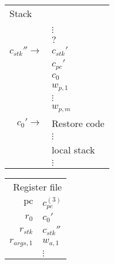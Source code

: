\documentclass[a4paper]{article}
\newcommand{\var}[1]{\mathit{#1}}
\newcommand{\pc}{\mathit{pc}}
\newcommand{\pcreg}{\mathrm{pc}}
\begin{document}
              \begin{figure}
                \label{fig:stack-after-restrict-and-zero}
                \centering
                \begin{tabular}[!h]{r | >{\raggedright\arraybackslash}p{3cm} |}
                  \multicolumn{2}{l}{Stack} \\
                  \cline{2-2}
               & \\
               & $\vdots$\\
                  \cline{2-2}
               & $?$\\
                  \cline{2-2}
                  $c_{\var{stk}}'' \rightarrow$  & $c_{\var{stk}}'$ \\
                  \cline{2-2}
               & $c_\pc'$ \\
                  \cline{2-2}
               & $c_0$ \\
                  \cline{2-2}
               & $w_{p,1}$ \\
                  \cline{2-2}
               & $\vdots$ \\
                  \cline{2-2}
               & $w_{p,m}$ \\
                  \cline{2-2}
                  $c_0' \rightarrow$   & Restore code \\
               & $\vdots$\\
                  \cline{2-2}
               & local stack\\
               & $\vdots$\\
                  \cline{2-2}
                \end{tabular}
                \hspace{1cm}
                \begin{tabular}{r | >{\centering\arraybackslash}p{0.75cm} |}
                  \multicolumn{2}{r}{Register file} \\
                  \cline{2-2}
                  $\pcreg$ & $c_{\pc}^{(3)}$\\
                  \cline{2-2}
                  $r_0$  & $c_0'$ \\
                  \cline{2-2}
                  $r_{\var{stk}}$  & $c_{\var{stk}}''$ \\
                  \cline{2-2}
                  $r_{\var{args},1}$ & $w_{a,1}$ \\
                  \cline{2-2}
                           & $\vdots$ \\
                  \cline{2-2}

\end{tabular}
\end{figure}
\end{document}
